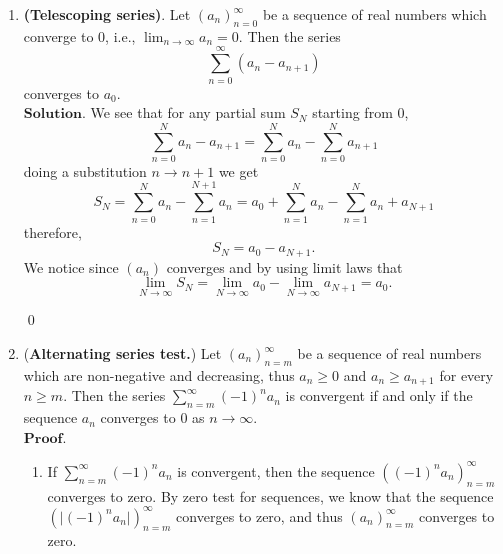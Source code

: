 \documentclass{article}
\theoremstyle{remark}
\begin{document}
\begin{enumerate}
\begin{enumerate}
        \item Similarly to the item before, due to the linear properties of both limit and partial sums we get 
        \[
        \sum_{n=m}^{N} ca_n = cT_N
        \]
        so that $\lim_{N\to\infty} S_N = \lim_{N\to\infty}cT_N = c\lim_{N\to\infty}T_N = cx$.

        \item If $\sum_{n=m}^{\infty}a_n$ converges then
        the first claim is trivial, follows from convergent limit properties.
        

        

    \end{enumerate}

    \item \textbf{(Telescoping series)}. Let \( (a_n)_{n=0}^{\infty} \) be a sequence of real numbers which converge to 0, i.e., \( \lim_{n \to \infty} a_n = 0 \). Then the series
    \[
    \sum_{n=0}^{\infty} (a_n - a_{n+1})
    \]
    converges to \( a_0 \).\\
    $\textbf{Solution.}$
    We see that for any partial sum $S_N$ starting from $0$, 
    \[
    \sum_{n=0}^{N}a_n - a_{n+1} = \sum_{n=0}^{N}a_n - \sum_{n=0}^{N}a_{n+1}
    \]
    doing a substitution $n \rightarrow n + 1$ we get
    \[
    S_N = \sum_{n=0}^{N}a_n - \sum_{n=1}^{N+1}a_{n} = a_0 + \sum_{n=1}^{N}a_n - \sum_{n=1}^{N}a_n + a_{N+1}
    \]
    therefore, 
    \[
    S_N = a_0 - a_{N+1}.
    \]
    We notice since $(a_n)$ converges and by using limit laws that
    \[
    \lim_{N\to\infty}S_N = \lim_{N\to\infty} a_0 - \lim_{N\to\infty}a_{N+1} = a_0.
    \]
    \begin{flushright}
        \qed
    \end{flushright}

    \item (\textbf{Alternating series test.}) Let $(a_n)_{n=m}^{\infty}$ be a sequence of real numbers which are non-negative and decreasing, 
    thus $a_n \geq 0$ and $a_n \geq a_{n+1}$ for every $n \geq m$. 
    Then the series $\sum_{n=m}^{\infty}(-1)^n a_n$ is convergent if and only if the 
    sequence $a_n$ converges to $0$ as $n \to \infty$.\\
    $\textbf{Proof.}$
    \begin{enumerate}
        \item[$(\implies)$] If \( \sum_{n=m}^{\infty} (-1)^n a_n \) is convergent, then the sequence $((-1)^n a_n)_{n=m}^{\infty}$ converges to zero.
        By zero test for sequences, we know that the sequence $(\vert (-1)^n a_n \vert)_{n=m}^{\infty}$ converges to zero, and thus $(a_n)_{n=m}^{\infty}$ converges to zero.


\end{enumerate}
\end{enumerate}
\end{document}
